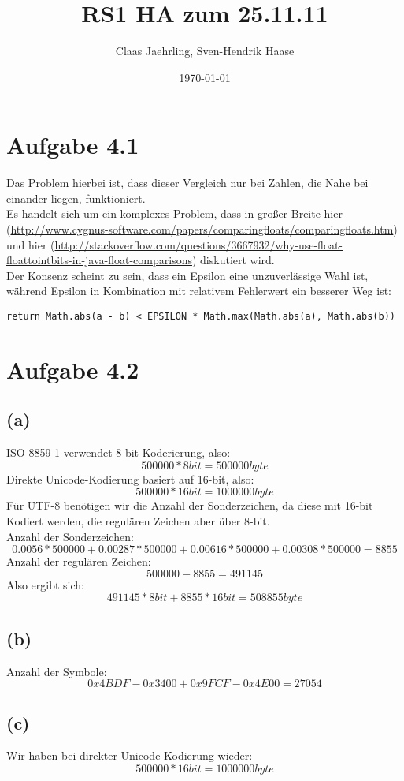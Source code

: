 \documentclass[12pt]{article}
\author{Claas Jaehrling, Sven-Hendrik Haase}
\title{RS1 HA zum 25.11.11}
\date{\today}
\begin{document}
\setcounter{secnumdepth}{0}
\maketitle

\section{Aufgabe 4.1}
Das Problem hierbei ist, dass dieser Vergleich nur bei Zahlen, die Nahe bei
einander liegen, funktioniert.
\\
Es handelt sich um ein komplexes Problem, dass in großer Breite hier
(\url{http://www.cygnus-software.com/papers/comparingfloats/comparingfloats.htm}) und hier (\url{http://stackoverflow.com/questions/3667932/why-use-float-floattointbits-in-java-float-comparisons}) diskutiert wird.
\\
Der Konsenz scheint zu sein, dass ein Epsilon eine unzuverlässige Wahl ist, während Epsilon in Kombination mit relativem Fehlerwert ein besserer Weg ist:
\begin{verbatim}
return Math.abs(a - b) < EPSILON * Math.max(Math.abs(a), Math.abs(b))
\end{verbatim}

\section{Aufgabe 4.2}
\subsection{(a)}
ISO-8859-1 verwendet 8-bit Koderierung, also: \[500000 * 8bit = 500000byte\]
Direkte Unicode-Kodierung basiert auf 16-bit, also: \[500000 * 16bit = 1000000byte\]
Für UTF-8 benötigen wir die Anzahl der Sonderzeichen, da diese mit 16-bit Kodiert werden, die regulären Zeichen aber über 8-bit.
\\
Anzahl der Sonderzeichen:
\[0.0056 * 500000 + 0.00287 * 500000 + 0.00616 * 500000 + 0.00308 * 500000 = 8855 \]
Anzahl der regulären Zeichen:
\[500000 - 8855 = 491145\]
Also ergibt sich:
\[491145 * 8bit + 8855 * 16bit = 508855byte\]

\subsection{(b)}
Anzahl der Symbole:
\[0x4BDF-0x3400+0x9FCF-0x4E00 = 27054\]

\subsection{(c)}
Wir haben bei direkter Unicode-Kodierung wieder:
\[500000 * 16bit = 1000000byte\]
\end{document}
